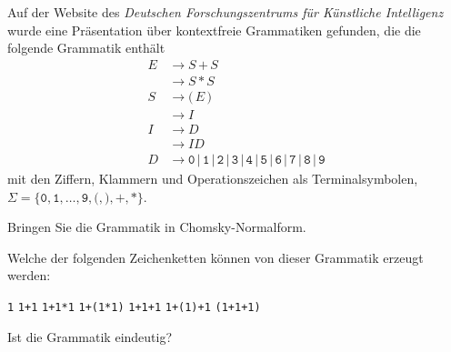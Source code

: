 Auf der Website des {\em Deutschen Forschungszentrums für Künstliche
Intelligenz} wurde eine Präsentation über kontextfreie 
Grammatiken gefunden, die die folgende Grammatik enthält
\begin{align*}
E&\to S\,\texttt{+}\,S\\
 &\to S\,\texttt{*}\,S\\
S&\to \texttt{(}\, E \, \texttt{)} \\
 &\to I\\
I&\to D\\ 
 &\to I D\\
D&\to
\texttt{0}
\,|\,
\texttt{1}
\,|\,
\texttt{2}
\,|\,
\texttt{3}
\,|\,
\texttt{4}
\,|\,
\texttt{5}
\,|\,
\texttt{6}
\,|\,
\texttt{7}
\,|\,
\texttt{8}
\,|\,
\texttt{9}
\end{align*}
mit den Ziffern, Klammern und Operationszeichen als Terminalsymbolen,
$\Sigma = \{\texttt{0},\texttt{1},\dots,\texttt{9},\texttt{(},\texttt{)},\texttt{+},\texttt{*}\}$.
\begin{teilaufgaben}
\item
Bringen Sie die Grammatik in Chomsky-Normalform.
\item
Welche der folgenden Zeichenketten können von dieser Grammatik
erzeugt werden:
\begin{center}
\texttt{1}
\qquad
\texttt{1+1}
\qquad
\texttt{1+1*1}
\qquad
\texttt{1+(1*1)}
\qquad
\texttt{1+1+1}
\qquad
\texttt{1+(1)+1}
\qquad
\texttt{(1+1+1)}
\end{center}
\item 
Ist die Grammatik eindeutig?
\end{teilaufgaben}

